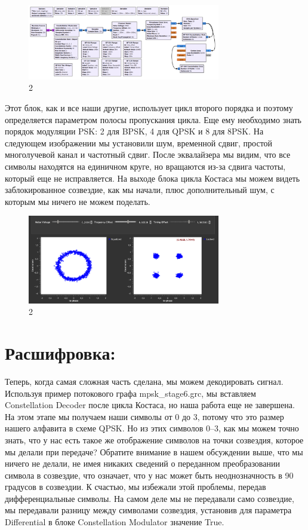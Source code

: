 \documentclass[10pt,a4paper,oneside]{article}
\begin{document}
\begin{figure}[H]
        \centering
        \includegraphics[width=0.75\textwidth]{pics/21.png}
        \caption{2}
        \label{fig:first}
\end{figure}

Этот блок, как и все наши другие, использует цикл второго порядка и поэтому определяется параметром полосы пропускания цикла. Еще ему необходимо знать порядок модуляции PSK: 2 для BPSK, 4 для QPSK и 8 для 8PSK. На следующем изображении мы установили шум, временной сдвиг, простой многолучевой канал и частотный сдвиг. После эквалайзера мы видим, что все символы находятся на единичном круге, но вращаются из-за сдвига частоты, который еще не исправляется. На выходе блока цикла Костаса мы можем видеть заблокированное созвездие, как мы начали, плюс дополнительный шум, с которым мы ничего не можем поделать.

\begin{figure}[H]
        \centering
        \includegraphics[width=0.75\textwidth]{pics/22.png}
        \caption{2}
        \label{fig:first}
\end{figure}

\section{Расшифровка:}

Теперь, когда самая сложная часть сделана, мы можем декодировать сигнал. Используя пример потокового графа mpsk_stage6.grc, мы вставляем Constellation Decoder после цикла Костаса, но наша работа еще не завершена. На этом этапе мы получаем наши символы от 0 до 3, потому что это размер нашего алфавита в схеме QPSK. Но из этих символов 0–3, как мы можем точно знать, что у нас есть такое же отображение символов на точки созвездия, которое мы делали при передаче? Обратите внимание в нашем обсуждении выше, что мы ничего не делали, не имея никаких сведений о переданном преобразовании символа в созвездие, что означает, что у нас может быть неоднозначность в 90 градусов в созвездии. К счастью, мы избежали этой проблемы, передав дифференциальные символы. На самом деле мы не передавали само созвездие, мы передавали разницу между символами созвездия, установив для параметра Differential в блоке Constellation Modulator значение True. 
\end{document}
